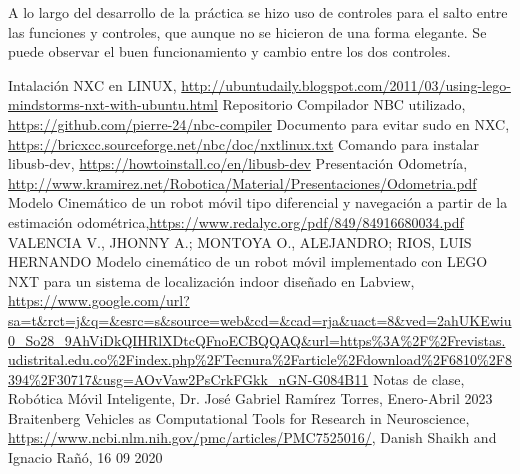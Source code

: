 \documentclass[oneside,onecolumn]{article}
\begin{document}
A lo largo del desarrollo de la práctica se hizo uso de controles para el salto entre las funciones y controles, que aunque no se hicieron de una forma elegante. Se puede observar el buen funcionamiento y cambio entre los dos controles.

\newpage
\begin{thebibliography}{0} %
 Intalación NXC en LINUX, \url{http://ubuntudaily.blogspot.com/2011/03/using-lego-mindstorms-nxt-with-ubuntu.html}
 Repositorio Compilador NBC utilizado, \url{https://github.com/pierre-24/nbc-compiler}
 Documento para evitar sudo en NXC, \url{https://bricxcc.sourceforge.net/nbc/doc/nxtlinux.txt}
 Comando para instalar libusb-dev, \url{https://howtoinstall.co/en/libusb-dev}
 Presentación Odometría, \url{http://www.kramirez.net/Robotica/Material/Presentaciones/Odometria.pdf}
 Modelo Cinemático de un robot móvil tipo diferencial y navegación a partir de la estimación odométrica,\url{https://www.redalyc.org/pdf/849/84916680034.pdf} VALENCIA V., JHONNY A.; MONTOYA O., ALEJANDRO; RIOS, LUIS HERNANDO
 Modelo cinemático de un robot móvil implementado con LEGO NXT para un sistema de localización indoor diseñado en Labview, \url{https://www.google.com/url?sa=t&rct=j&q=&esrc=s&source=web&cd=&cad=rja&uact=8&ved=2ahUKEwiu0_So28_9AhViDkQIHRlXDtcQFnoECBQQAQ&url=https%3A%2F%2Frevistas.udistrital.edu.co%2Findex.php%2FTecnura%2Farticle%2Fdownload%2F6810%2F8394%2F30717&usg=AOvVaw2PsCrkFGkk_nGN-G084B11}
 Notas de clase, Robótica Móvil Inteligente, Dr. José Gabriel Ramírez Torres, Enero-Abril 2023  
 Braitenberg Vehicles as Computational Tools for Research in Neuroscience, \url{https://www.ncbi.nlm.nih.gov/pmc/articles/PMC7525016/}, Danish Shaikh and Ignacio Rañó, 16 09 2020
    
\end{thebibliography}

\end{document}
